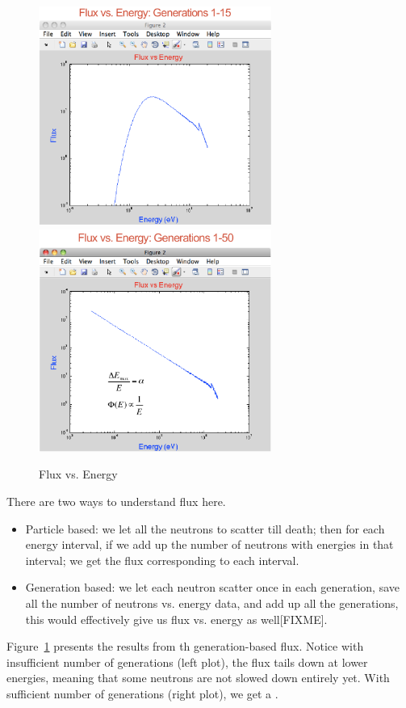 \documentclass{school-22.211-notes}
\begin{document}
\begin{figure}
  \centering
  \includegraphics[width=3in]{images/sl-d/flux-vs-energy-1.png}
  \includegraphics[width=3in]{images/sl-d/flux-vs-energy-2.png}
  \caption{Flux vs. Energy} \label{fve}
\end{figure}
There are two ways to understand flux here. 
\begin{itemize}
\item Particle based: we let all the neutrons to scatter till death; then for each energy interval, if we add up the number of neutrons with energies in that interval; we get the flux corresponding to each interval.  
\item Generation based: we let each neutron scatter once in each generation, save all the number of neutrons vs. energy data, and add up all the generations, this would effectively give us flux vs. energy as well[FIXME]. 
\end{itemize}
Figure~\ref{fve} presents the results from th generation-based flux. Notice with insufficient number of generations (left plot), the flux tails down at lower energies, meaning that some neutrons are not slowed down entirely yet. With sufficient number of generations (right plot), we get a . 
\end{document}
